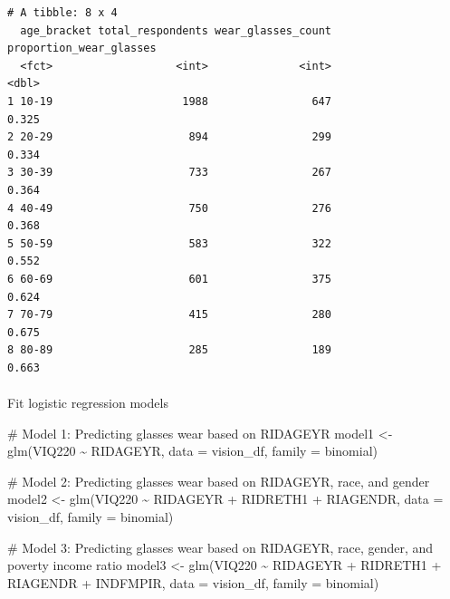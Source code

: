 \documentclass[
  12pt,
]{article}
\makeatletter
\let\oldparagraph\paragraph
\renewcommand{\paragraph}{
    \@ifstar
      \xxxParagraphStar
      \xxxParagraphNoStar
  }
\newcommand{\xxxParagraphStar}[1]{\oldparagraph*{#1}\mbox{}}
\newcommand{\xxxParagraphNoStar}[1]{\oldparagraph{#1}\mbox{}}
\newenvironment{Shaded}{\begin{snugshade}}{\end{snugshade}}
\newcommand{\AttributeTok}[1]{\textcolor[rgb]{0.40,0.45,0.13}{#1}}
\newcommand{\CommentTok}[1]{\textcolor[rgb]{0.37,0.37,0.37}{#1}}
\newcommand{\FunctionTok}[1]{\textcolor[rgb]{0.28,0.35,0.67}{#1}}
\newcommand{\NormalTok}[1]{\textcolor[rgb]{0.00,0.23,0.31}{#1}}
\newcommand{\OtherTok}[1]{\textcolor[rgb]{0.00,0.23,0.31}{#1}}
\newcommand{\SpecialCharTok}[1]{\textcolor[rgb]{0.37,0.37,0.37}{#1}}
\makeatother
\begin{document}
\begin{verbatim}
# A tibble: 8 x 4
  age_bracket total_respondents wear_glasses_count proportion_wear_glasses
  <fct>                   <int>              <int>                   <dbl>
1 10-19                    1988                647                   0.325
2 20-29                     894                299                   0.334
3 30-39                     733                267                   0.364
4 40-49                     750                276                   0.368
5 50-59                     583                322                   0.552
6 60-69                     601                375                   0.624
7 70-79                     415                280                   0.675
8 80-89                     285                189                   0.663
\end{verbatim}

\paragraph{Fit logistic regression
models}\label{fit-logistic-regression-models}

\begin{Shaded}
\begin{Highlighting}[]
\CommentTok{\# Model 1: Predicting glasses wear based on RIDAGEYR}
\NormalTok{model1 }\OtherTok{\textless{}{-}} \FunctionTok{glm}\NormalTok{(VIQ220 }\SpecialCharTok{\textasciitilde{}}\NormalTok{ RIDAGEYR, }\AttributeTok{data =}\NormalTok{ vision\_df, }\AttributeTok{family =}\NormalTok{ binomial)}

\CommentTok{\# Model 2: Predicting glasses wear based on RIDAGEYR, race, and gender}
\NormalTok{model2 }\OtherTok{\textless{}{-}} \FunctionTok{glm}\NormalTok{(VIQ220 }\SpecialCharTok{\textasciitilde{}}\NormalTok{ RIDAGEYR }\SpecialCharTok{+}\NormalTok{ RIDRETH1 }\SpecialCharTok{+}\NormalTok{ RIAGENDR, }\AttributeTok{data =}\NormalTok{ vision\_df, }\AttributeTok{family =}\NormalTok{ binomial)}

\CommentTok{\# Model 3: Predicting glasses wear based on RIDAGEYR, race, gender, and poverty income ratio}
\NormalTok{model3 }\OtherTok{\textless{}{-}} \FunctionTok{glm}\NormalTok{(VIQ220 }\SpecialCharTok{\textasciitilde{}}\NormalTok{ RIDAGEYR }\SpecialCharTok{+}\NormalTok{ RIDRETH1 }\SpecialCharTok{+}\NormalTok{ RIAGENDR }\SpecialCharTok{+}\NormalTok{ INDFMPIR, }\AttributeTok{data =}\NormalTok{ vision\_df, }\AttributeTok{family =}\NormalTok{ binomial)}
\end{Highlighting}
\end{Shaded}
\end{document}
